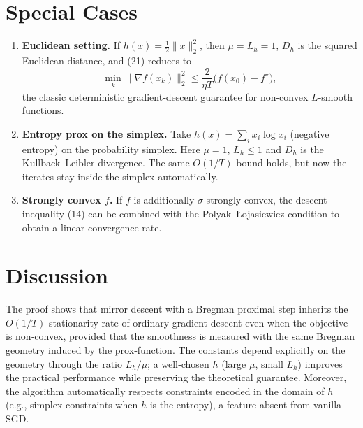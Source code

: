 \documentclass{article}
\begin{document}
\section*{Special Cases}
\begin{enumerate}
\item \textbf{Euclidean setting.}
If $h(x)=\tfrac12\|x\|_2^{2}$, then $\mu=L_h=1$, $D_h$ is the squared
Euclidean distance, and (21) reduces to
\[
\min_{k}\|\nabla f(x_k)\|_2^{2}
\le \frac{2}{\eta T}\bigl(f(x_0)-f^\star\bigr),
\]
the classic deterministic gradient‑descent guarantee for
non‑convex $L$‑smooth functions.

\item \textbf{Entropy prox on the simplex.}
Take $h(x)=\sum_{i}x_i\log x_i$ (negative entropy) on the probability
simplex.  Here $\mu=1$, $L_h\le 1$ and $D_h$ is the Kullback–Leibler
divergence.  The same $O(1/T)$ bound holds, but now the iterates stay
inside the simplex automatically.

\item \textbf{Strongly convex $f$.}
If $f$ is additionally $\sigma$‑strongly convex, the descent inequality
(14) can be combined with the Polyak–Łojasiewicz condition to obtain
a linear convergence rate.
\end{enumerate}

\section*{Discussion}
The proof shows that mirror descent with a Bregman proximal step
inherits the $O(1/T)$ stationarity rate of ordinary gradient descent
even when the objective is non‑convex, provided that the smoothness
is measured with the same Bregman geometry induced by the prox‑function.
The constants depend explicitly on the geometry through the ratio
$L_h/\mu$; a well‑chosen $h$ (large $\mu$, small $L_h$) improves the
practical performance while preserving the theoretical guarantee.
Moreover, the algorithm automatically respects constraints encoded
in the domain of $h$ (e.g., simplex constraints when $h$ is the
entropy), a feature absent from vanilla SGD.
\end{document}
